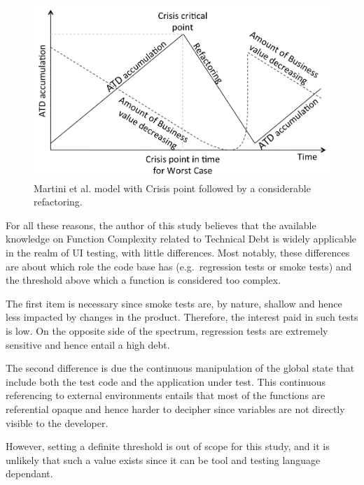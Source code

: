     \begin{figure}[!htbp]
    	\centering
    	\includegraphics[width=\textwidth]{figure/discussion/martini-model.png}
    	\caption{Martini et al. \cite{martini2014architecture} model with Crisis point followed by a considerable refactoring.}
    	\label{fig:antonio-model}
		\end{figure}

    For all these reasons, the author of this study believes that the available knowledge on Function Complexity related to Technical Debt is widely applicable in the realm of UI testing, with little differences. Most notably, these differences are about which role the code base has (e.g.\ regression tests or smoke tests) and the threshold above which a function is considered too complex.


     \label{sec:disc-rq3-function-complexity}
    The first item is necessary since smoke tests are, by nature, shallow and hence less impacted by changes in the product. Therefore, the interest paid in such tests is low. On the opposite side of the spectrum, regression tests are extremely sensitive and hence entail a high debt.

    The second difference is due the continuous manipulation of the global state that include both the test code and the application under test. This continuous referencing to external environments entails that most of the functions are referential opaque \cite{referential_transparency} and hence harder to decipher since variables are not directly visible to the developer.

    However, setting a definite threshold is out of scope for this study, and it is unlikely that such a value exists since it can be tool and testing language dependant.

